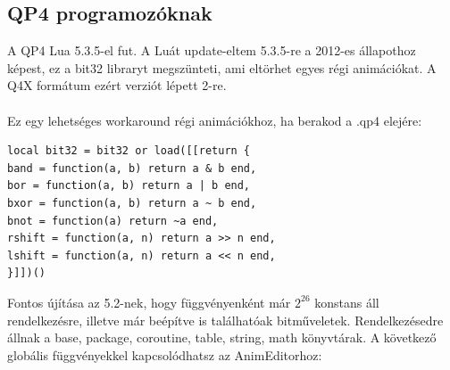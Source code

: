 \documentclass[a4paper,12pt,release]{article}
\begin{document}
\subsection{QP4 programozóknak}
A QP4 Lua 5.3.5-el fut. A Luát update-eltem 5.3.5-re a 2012-es állapothoz képest, ez a bit32 libraryt megszünteti, ami eltörhet egyes régi animációkat. A Q4X formátum ezért verziót lépett 2-re.
\\
\\Ez egy lehetséges workaround régi animációkhoz, ha berakod a .qp4 elejére:
\begin{verbatim}
local bit32 = bit32 or load([[return {
band = function(a, b) return a & b end,
bor = function(a, b) return a | b end,
bxor = function(a, b) return a ~ b end,
bnot = function(a) return ~a end,
rshift = function(a, n) return a >> n end,
lshift = function(a, n) return a << n end,
}]])()
\end{verbatim}
Fontos újítása az 5.2-nek, hogy függvényenként már $2^{26}$ konstans áll rendelkezésre, illetve már beépítve is találhatóak bitműveletek. Rendelkezésedre állnak a base, package, coroutine, table, string, math könyvtárak.
A következő globális függvényekkel kapcsolódhatsz az AnimEditorhoz:
\end{document}

